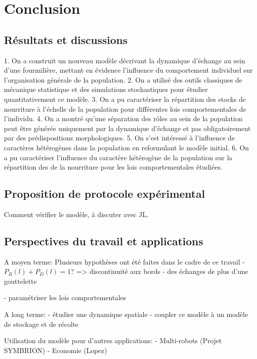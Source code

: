 \chapter{Conclusion}

\section{Résultats et discussions}
1. On a construit un nouveau modèle décrivant la dynamique d'échange au sein d'une fourmilière, mettant en évidence l'influence du comportement individuel sur l'organisation générale de la population.
2. On a utilisé des outils classiques de mécanique statistique et des simulations stochastiques pour étudier quantitativement ce modèle.
3. On a pu caractériser la répartition des stocks de nourriture à l'échelle de la population pour différentes lois comportementales de l'individu.
4. On a montré qu'une séparation des rôles au sein de la population peut être générée uniquement par la dynamique d'échange et pas obligatoirement par des prédispositions morphologiques.
5. On s'est intéressé à l'influence de caractères hétérogènes dans la population en reformulant le modèle initial. 
6. On a pu caractériser l'influence du caractère hétérogène de la population sur la répartition des de la nourriture pour les lois comportementales étudiées.




\section{Proposition de protocole expérimental}
Comment vérifier le modèle, à discuter avec JL.

\section{Perspectives du travail et applications}
A moyen terme:
Plusieurs hypothèses ont été faites dans le cadre de ce travail
- $P_R(l) + P_D(l) =1$? => discontinuité aux bords
- des échanges de plus d'une gouttelette

- paramétriser les lois comportementales

A long terme:
- étudier une dynamique spatiale
- coupler ce modèle à un modèle de stockage et de récolte

Utilisation du modèle pour d'autres applications:
- Multi-robots (Projet SYMBRION)
- Economie (Lopez)